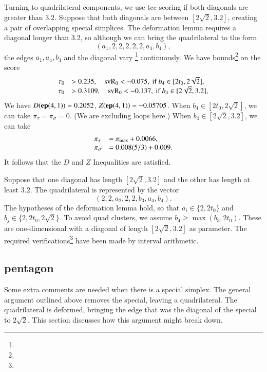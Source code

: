 Turning to quadrilateral components, we use tcc scoring if both diagonals
are greater than $3.2$.   Suppose that both diagonals are between
$[2\sqrt{2},3.2]$, creating a pair of overlapping special simplices. The
deformation lemma requires a diagonal longer than $3.2$, so although we
can bring the quadrilateral to the form
    $$(a_1,2,2,2,2,2,a_4,b_4),$$
the edges $a_1,a_4,b_4$ and the diagonal vary%
\footnote{} %
continuously.
We have bounds\footnote{} %
 on the score
    $$
    \begin{array}{lll}
    \tau_0 &> 0.235, \quad {\operatorname{svR}}_0 < -0.075,
                \hbox{ if } b_4\in[2t_0,2\sqrt{2}],\\
    \tau_0 &> 0.3109, \quad {\operatorname{svR}}_0 < -0.137,
                \hbox{ if } b_4\in[2\sqrt{2},3.2],\\
    \end{array}
    $$
We have $D({\operatorname{\bf ep}}{(4,1)})=0.2052$, $Z({\operatorname{\bf ep}}{(4,1)})=-0.05705$. When
$b_4\in[2t_0,2\sqrt{2}]$, we can take $\pi_\tau=\pi_\sigma=0$. (We are
excluding loops here.) When $b_4\in[2\sqrt{2},3.2]$, we can take
    $$
    \begin{array}{lll}
    \pi_\tau &= \pi_{\max}+ 0.0066, \\
    \pi_\sigma &= 0.008 (5/3)+ 0.009. \\
    \end{array}
    $$
It follows that the $D$ and $Z$ Inequalities are satisfied.

Suppose that one diagonal has length $[2\sqrt{2},3.2]$ and the other has
length at least $3.2$.  The quadrilateral is represented by the vector
    $$(2,2,a_2,2,2,b_3,a_4,b_4).$$
The hypotheses of the deformation lemma hold, so that $a_i\in\{2,2t_0\}$
and $b_j\in\{2,2t_0,2\sqrt2\}$. To avoid quad clusters, we assume
$b_4\ge\max(b_3,2t_0)$. These are one-dimensional with a diagonal of
length $[2\sqrt{2},3.2]$ as parameter.
 The required verifications\footnote{} %
have been made by interval arithmetic.


\subsection{pentagon} %

Some extra comments are needed when there is a special simplex. The
general argument outlined above removes the special, leaving a
quadrilateral.  The quadrilateral is deformed, bringing the edge that
was the diagonal of the special to $2\sqrt{2}$. This section discusses
how this argument might break down.

